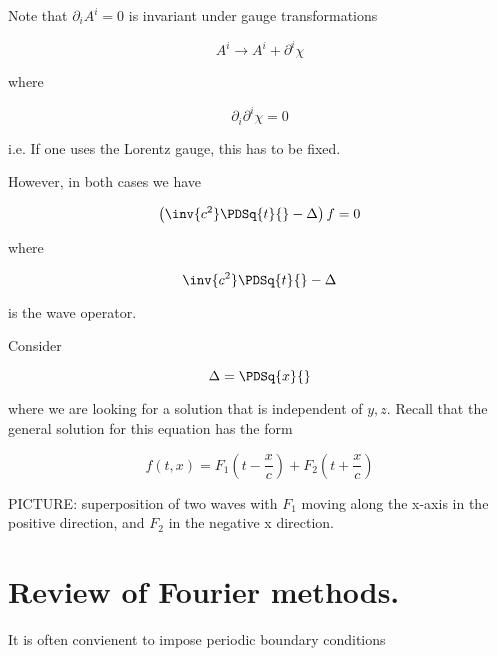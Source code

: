 Note that $\partial_i A^i = 0$ is invariant under gauge transformations

\begin{equation}\label{eqn:relativisticElectrodynamicsL15:50}
A^i \rightarrow A^i + \partial^i \chi
\end{equation}

where 

\begin{equation}\label{eqn:relativisticElectrodynamicsL15:70}
\partial_i \partial^i \chi = 0
\end{equation}

i.e.  If one uses the Lorentz gauge, this has to be fixed.

However, in both cases we have 

\begin{equation}\label{eqn:relativisticElectrodynamicsL15:90}
\left( \inv{c^2} \PDSq{t}{} - \Delta \right) f = 0
\end{equation}

where 

\begin{equation}\label{eqn:relativisticElectrodynamicsL15:110}
\inv{c^2} \PDSq{t}{} - \Delta 
\end{equation}

is the wave operator.

Consider 

\begin{equation}\label{eqn:relativisticElectrodynamicsL15:130}
\Delta = \PDSq{x}{}
\end{equation}

where we are looking for a solution that is independent of $y, z$.  Recall that the general solution for this equation has the form

\begin{equation}\label{eqn:relativisticElectrodynamicsL15:150}
f(t, x) = 
F_1 \left(t - \frac{x}{c}\right)
+F_2 \left(t + \frac{x}{c}\right)
\end{equation}

PICTURE: superposition of two waves with $F_1$ moving along the x-axis in the positive direction, and $F_2$ in the negative x direction.

\section{Review of Fourier methods.}

It is often convienent to impose periodic boundary conditions


